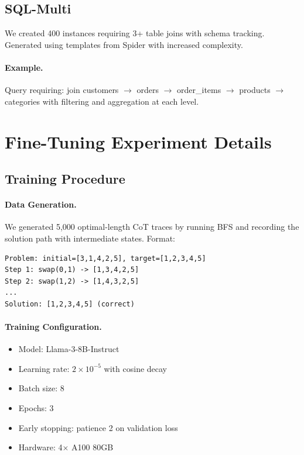 \documentclass{article}
\theoremstyle{plain}
\theoremstyle{definition}
\theoremstyle{remark}
\begin{document}
\subsection{SQL-Multi}

We created 400 instances requiring 3+ table joins with schema tracking. Generated using templates from Spider \citep{yu2018spider} with increased complexity.

\paragraph{Example.} Query requiring: join customers $\rightarrow$ orders $\rightarrow$ order\_items $\rightarrow$ products $\rightarrow$ categories with filtering and aggregation at each level.


\section{Fine-Tuning Experiment Details}
\label{app:finetune}

\subsection{Training Procedure}

\paragraph{Data Generation.} We generated 5,000 optimal-length CoT traces by running BFS and recording the solution path with intermediate states. Format:
\begin{verbatim}
Problem: initial=[3,1,4,2,5], target=[1,2,3,4,5]
Step 1: swap(0,1) -> [1,3,4,2,5]
Step 2: swap(1,2) -> [1,4,3,2,5]
...
Solution: [1,2,3,4,5] (correct)
\end{verbatim}

\paragraph{Training Configuration.}
\begin{itemize}
\item Model: Llama-3-8B-Instruct
\item Learning rate: $2 \times 10^{-5}$ with cosine decay
\item Batch size: 8
\item Epochs: 3
\item Early stopping: patience 2 on validation loss
\item Hardware: 4$\times$ A100 80GB
\end{itemize}
\end{document}
